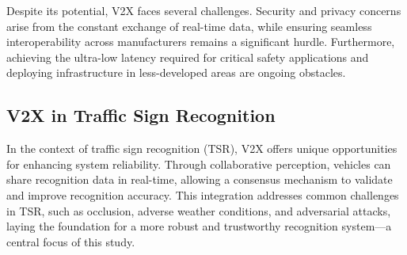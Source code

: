 Despite its potential, V2X faces several challenges. Security and privacy concerns arise from the constant
 exchange of real-time data, while ensuring seamless interoperability across manufacturers remains a significant 
 hurdle. Furthermore, achieving the ultra-low latency required for critical safety applications and deploying 
 infrastructure in less-developed areas are ongoing obstacles.

 \subsection{V2X in Traffic Sign Recognition}

In the context of traffic sign recognition (TSR), V2X offers unique opportunities for enhancing system reliability.
 Through collaborative perception, vehicles can share recognition data in real-time, allowing a consensus mechanism 
 to validate and improve recognition accuracy. This integration addresses common challenges in TSR, such as occlusion, 
 adverse weather conditions, and adversarial attacks, laying the foundation for a more robust and trustworthy recognition 
 system—a central focus of this study.